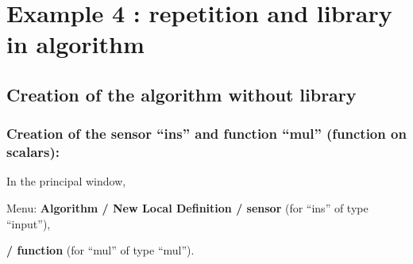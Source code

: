 \documentclass[a4paper,twoside]{report}
\begin{document}
\chapter{Example 4 : repetition and library in algorithm}
\section{Creation of the algorithm without library}
\subsection{Creation of the sensor ``ins'' and function ``mul'' (function on scalars):}

In the principal window,

Menu: \textbf{Algorithm / New Local Definition / sensor} (for ``ins'' of type
``input''),

\hspace{175pt}\textbf{/ function} (for ``mul'' of type ``mul'').
\end{document}
